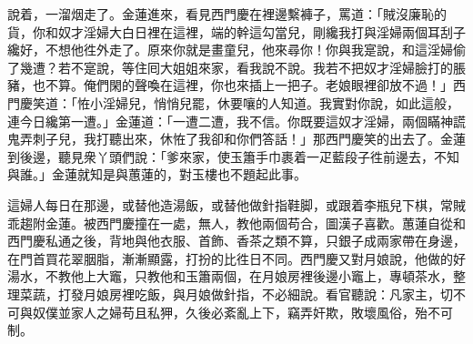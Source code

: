 說着，一溜烟走了。金蓮進來，看見西門慶在裡邊繫褲子，罵道：「賊沒廉恥的貨，你和奴才淫婦大白日裡在這裡，端的幹這勾當兒，剛纔我打與淫婦兩個耳刮子纔好，不想他徃外走了。原來你就是畫童兒，他來尋你！你與我寔說，和這淫婦偷了幾遭？若不寔說，等住囘大姐姐來家，看我說不說。我若不把奴才淫婦臉打的脹豬，也不算。俺們閑的聲喚在這裡，你也來插上一把子。{}老娘眼裡卻放不過！」西門慶笑道：「恠小淫婦兒，悄悄兒罷，休要嚷的人知道。我實對你說，如此這般，連今日纔第一遭。」金蓮道：「一遭二遭，我不信。你既要這奴才淫婦，兩個瞞神謊鬼弄刺子兒，我打聽出來，休恠了我卻和你們答話！」那西門慶笑的出去了。金蓮到後邊，聽見衆丫頭們說：「爹來家，使玉簫手巾裹着一疋藍段子徃前邊去，不知與誰。」金蓮就知是與蕙蓮的，對玉樓也不題起此事。

這婦人每日在那邊，或替他造湯飯，或替他做針指鞋脚，或跟着李瓶兒下棋，常賊乖趨附金蓮。被西門慶撞在一處，無人，教他兩個苟合，圖漢子喜歡。蕙蓮自從和西門慶私通之後，背地與他衣服、首飾、香茶之類不算，只銀子成兩家帶在身邊，在門首買花翠胭脂，漸漸顯露，打扮的比徃日不同。西門慶又對月娘說，他做的好湯水，不教他上大竈，只教他和玉簫兩個，在月娘房裡後邊小竈上，專頓茶水，整理菜蔬，打發月娘房裡吃飯，與月娘做針指，不必細說。看官聽說：凡家主，切不可與奴僕並家人之婦苟且私狎，久後必紊亂上下，竊弄奸欺，敗壞風俗，殆不可制。

